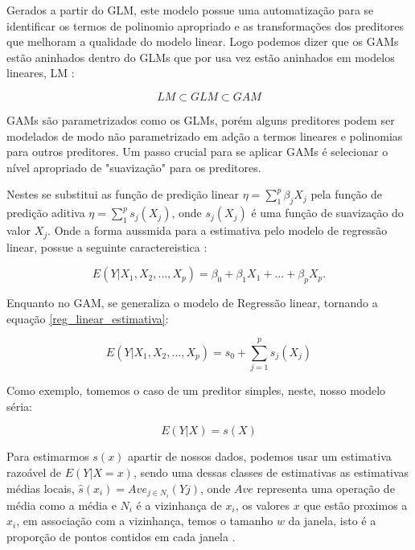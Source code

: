 \documentclass[
	12pt,				%
	openright,			%
	oneside,			%
	a4paper,			%
	english,			%
	brazil				%
	]{abntex2}
\begin{document}
Gerados a partir do GLM, este modelo possue uma automatização para se identificar os termos de polinomio apropriado
e as transformações dos preditores que melhoram a qualidade do modelo linear. Logo podemos dizer que os GAMs estão
aninhados dentro do GLMs que por usa vez estão aninhados em modelos lineares, LM \cite{GAMeGLM_especie_estudo}:

\begin{equation}
	LM \subset GLM \subset GAM
\end{equation}

GAMs são parametrizados como os GLMs, porém alguns preditores podem ser modelados de modo não parametrizado em 
adção a termos lineares e polinomias para outros preditores. Um passo crucial para se aplicar GAMs é selecionar
o nível apropriado de "suavização" para os preditores.

Nestes se substitui as função de predição linear $\eta = \sum_{1}^{p}\beta_jX_j$ pela função de predição aditiva 
$\eta = \sum_{1}^{p}s_j(X_j)$, onde $s_j(X_j)$ é uma função de suavização do valor $X_j$. Onde a forma aussmida
para a estimativa pelo modelo de regressão linear, possue a seguinte caractereistica \cite{GAM}:

\begin{equation}
	\label{reg_linear_estimativa}
	E(Y|X_1,X_2,...,X_p) = \beta_0 + \beta_1X_1 + ... + \beta_pX_p.
\end{equation}

Enquanto no GAM, se generaliza o modelo de Regressão linear, tornando a equação \ref{reg_linear_estimativa}:

\begin{equation}
	\label{reg_linear_generalizada}
	E(Y|X_1,X_2,...,X_p) = s_0 + \sum_{j=1}^{p} s_j(X_j)
\end{equation}

Como exemplo, tomemos o caso de um preditor simples, neste, nosso modelo séria:

\begin{equation}
	\label{preditor_simples}
	E(Y|X) = s(X)
\end{equation}

Para estimarmos $s(x)$ apartir de nossos dados, podemos usar um estimativa razoável de $E(Y|X=x)$, sendo uma dessas 
classes de estimativas as estimativas médias locais, $\hat{s}(x_i) = Ave_{j \in N_i}(Yj)$, onde $Ave$ representa uma
operação de média como a média e $N_i$ é a vizinhança de $x_i$, os valores $x$ que estão proximos a $x_i$, em
associação com a vizinhança, temos o tamanho $w$ da janela, isto é a proporção de pontos contidos em cada janela \cite{GAM}.
\end{document}
